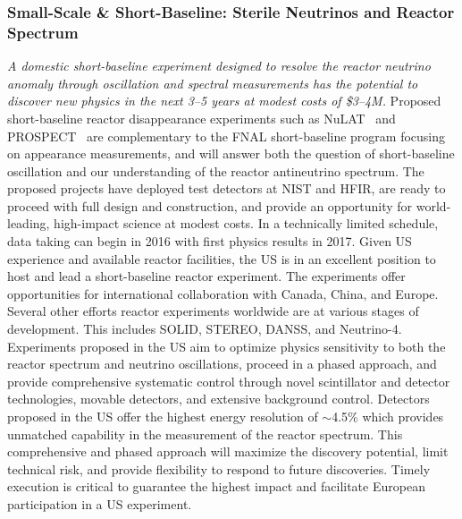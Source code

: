 \subsubsection{Small-Scale \& Short-Baseline: Sterile Neutrinos and Reactor Spectrum}
{\em A domestic short-baseline experiment designed to resolve the
reactor neutrino anomaly through oscillation and spectral measurements
has the potential to discover new physics in the next 3--5 years at
modest costs of \$3--4M.}  Proposed short-baseline reactor
disappearance experiments such as NuLAT~\cite{Lane:2015alq} and
PROSPECT~\cite{Ashenfelter:2013oaa} are complementary to the FNAL
short-baseline program focusing on appearance measurements, and will
answer both the question of short-baseline oscillation and our
understanding of the reactor antineutrino spectrum. The proposed
projects have deployed test detectors at NIST and HFIR, are ready to
proceed with full design and construction, and provide an opportunity
for world-leading, high-impact science at modest costs. In a
technically limited schedule, data taking can begin in 2016 with first
physics results in 2017. Given US experience and available reactor
facilities, the US is in an excellent position to host and lead a
short-baseline reactor experiment. The experiments offer opportunities
for international collaboration with Canada, China, and Europe.
Several other efforts reactor experiments worldwide are at various
stages of development. This includes SOLID, STEREO, DANSS, and
Neutrino-4. Experiments proposed in the US aim to optimize physics
sensitivity to both the reactor spectrum and neutrino oscillations,
proceed in a phased approach, and provide comprehensive systematic
control through novel scintillator and detector technologies, movable
detectors, and extensive background control. Detectors proposed in the
US offer the highest energy resolution of $\sim$4.5\% which provides
unmatched capability in the measurement of the reactor spectrum. This
comprehensive and phased approach will maximize the discovery
potential, limit technical risk, and provide flexibility to respond to
future discoveries.  Timely execution is critical to guarantee the
highest impact and facilitate European participation in a US
experiment.

